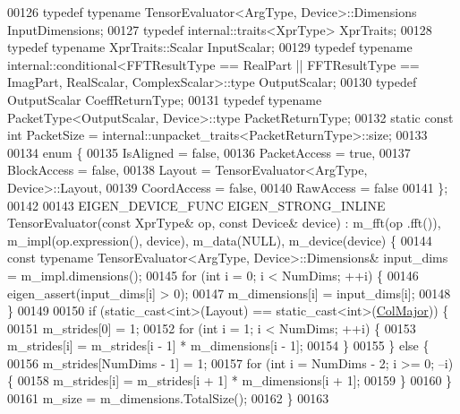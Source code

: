 \begin{DoxyCode}
00126   \textcolor{keyword}{typedef} \textcolor{keyword}{typename} TensorEvaluator<ArgType, Device>::Dimensions InputDimensions;
00127   \textcolor{keyword}{typedef} internal::traits<XprType> XprTraits;
00128   \textcolor{keyword}{typedef} \textcolor{keyword}{typename} XprTraits::Scalar InputScalar;
00129   \textcolor{keyword}{typedef} \textcolor{keyword}{typename} internal::conditional<FFTResultType == RealPart || FFTResultType == ImagPart,
       RealScalar, ComplexScalar>::type OutputScalar;
00130   \textcolor{keyword}{typedef} OutputScalar CoeffReturnType;
00131   \textcolor{keyword}{typedef} \textcolor{keyword}{typename} PacketType<OutputScalar, Device>::type PacketReturnType;
00132   \textcolor{keyword}{static} \textcolor{keyword}{const} \textcolor{keywordtype}{int} PacketSize = internal::unpacket\_traits<PacketReturnType>::size;
00133 
00134   \textcolor{keyword}{enum} \{
00135     IsAligned = \textcolor{keyword}{false},
00136     PacketAccess = \textcolor{keyword}{true},
00137     BlockAccess = \textcolor{keyword}{false},
00138     Layout = TensorEvaluator<ArgType, Device>::Layout,
00139     CoordAccess = \textcolor{keyword}{false},
00140     RawAccess = \textcolor{keyword}{false}
00141   \};
00142 
00143   EIGEN\_DEVICE\_FUNC EIGEN\_STRONG\_INLINE TensorEvaluator(\textcolor{keyword}{const} XprType& op, \textcolor{keyword}{const} Device& device) : m\_fft(op
      .fft()), m\_impl(op.expression(), device), m\_data(NULL), m\_device(device) \{
00144     \textcolor{keyword}{const} \textcolor{keyword}{typename} TensorEvaluator<ArgType, Device>::Dimensions& input\_dims = m\_impl.dimensions();
00145     \textcolor{keywordflow}{for} (\textcolor{keywordtype}{int} i = 0; i < NumDims; ++i) \{
00146       eigen\_assert(input\_dims[i] > 0);
00147       m\_dimensions[i] = input\_dims[i];
00148     \}
00149 
00150     \textcolor{keywordflow}{if} (static\_cast<int>(Layout) == static\_cast<int>(\hyperlink{group__enums_ggaacded1a18ae58b0f554751f6cdf9eb13a0cbd4bdd0abcfc0224c5fcb5e4f6669a}{ColMajor})) \{
00151       m\_strides[0] = 1;
00152       \textcolor{keywordflow}{for} (\textcolor{keywordtype}{int} i = 1; i < NumDims; ++i) \{
00153         m\_strides[i] = m\_strides[i - 1] * m\_dimensions[i - 1];
00154       \}
00155     \} \textcolor{keywordflow}{else} \{
00156       m\_strides[NumDims - 1] = 1;
00157       \textcolor{keywordflow}{for} (\textcolor{keywordtype}{int} i = NumDims - 2; i >= 0; --i) \{
00158         m\_strides[i] = m\_strides[i + 1] * m\_dimensions[i + 1];
00159       \}
00160     \}
00161     m\_size = m\_dimensions.TotalSize();
00162   \}
00163 

\end{DoxyCode}
